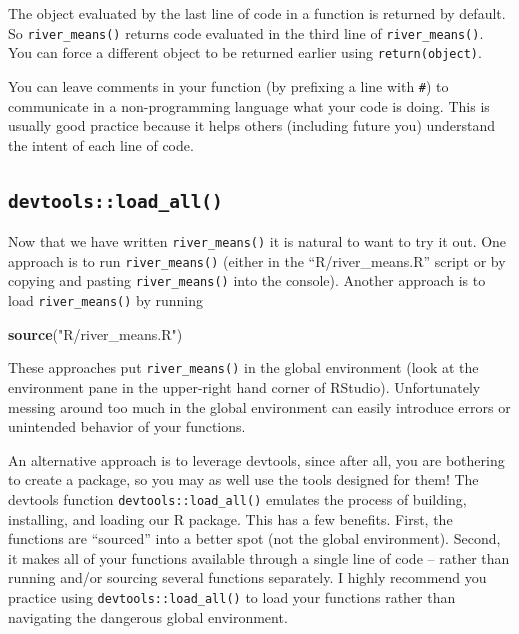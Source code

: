 \documentclass[
]{book}
\newenvironment{Shaded}{\begin{snugshade}}{\end{snugshade}}
\newcommand{\KeywordTok}[1]{\textcolor[rgb]{0.13,0.29,0.53}{\textbf{#1}}}
\newcommand{\NormalTok}[1]{#1}
\newcommand{\StringTok}[1]{\textcolor[rgb]{0.31,0.60,0.02}{#1}}
\begin{document}
The object evaluated by the last line of code in a function is returned by default. So \texttt{river\_means()} returns code evaluated in the third line of \texttt{river\_means()}. You can force a different object to be returned earlier using \texttt{return(object)}.

You can leave comments in your function (by prefixing a line with \texttt{\#}) to communicate in a non-programming language what your code is doing. This is usually good practice because it helps others (including future you) understand the intent of each line of code.

\hypertarget{load-all}{%
\subsection{\texorpdfstring{\texttt{devtools::load\_all()}}{devtools::load\_all()}}\label{load-all}}

Now that we have written \texttt{river\_means()} it is natural to want to try it out. One approach is to run \texttt{river\_means()} (either in the ``R/river\_means.R'' script or by copying and pasting \texttt{river\_means()} into the console). Another approach is to load \texttt{river\_means()} by running

\begin{Shaded}
\begin{Highlighting}[]
\KeywordTok{source}\NormalTok{(}\StringTok{"R/river_means.R"}\NormalTok{)}
\end{Highlighting}
\end{Shaded}

These approaches put \texttt{river\_means()} in the global environment (look at the environment pane in the upper-right hand corner of RStudio). Unfortunately messing around too much in the global environment can easily introduce errors or unintended behavior of your functions.

An alternative approach is to leverage devtools, since after all, you are bothering to create a package, so you may as well use the tools designed for them! The devtools function \texttt{devtools::load\_all()} emulates the process of building, installing, and loading our R package. This has a few benefits. First, the functions are ``sourced'' into a better spot (not the global environment). Second, it makes all of your functions available through a single line of code -- rather than running and/or sourcing several functions separately. I highly recommend you practice using \texttt{devtools::load\_all()} to load your functions rather than navigating the dangerous global environment.
\end{document}
